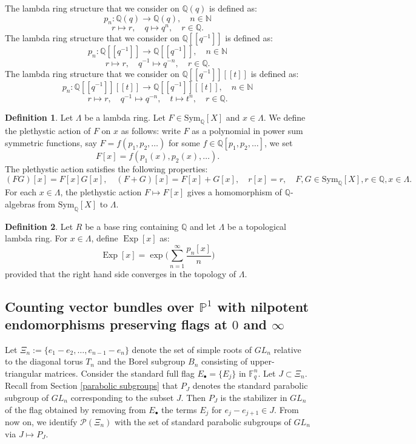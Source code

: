 \documentclass{amsart}
\theoremstyle{plain}
\theoremstyle{definition}
\newtheorem{definition}{Definition}
\theoremstyle{remark}
\DeclareMathOperator{\Exp}{Exp}
\begin{document}
The lambda ring structure that we consider on $\mathbb{Q}(q)$ is defined as:
\[
p_{n}:\mathbb{Q}(q)\rightarrow\mathbb{Q}(q), \quad n\in\mathbb{N}
\]
\[
r\mapsto r, \quad q\mapsto q^{n},\quad r\in\mathbb{Q}.
\]
The lambda ring structure that we consider on $\mathbb{Q}[[q^{-1}]]$ is defined as:
\[
p_{n}:\mathbb{Q}[[q^{-1}]]\rightarrow\mathbb{Q}[[q^{-1}]], \quad n\in\mathbb{N}
\]
\[
r\mapsto r, \quad q^{-1}\mapsto q^{-n},\quad r\in\mathbb{Q}.
\]
The lambda ring structure that we consider on $\mathbb{Q}[[q^{-1}]][[t]]$ is defined as:
\[
p_{n}:\mathbb{Q}[[q^{-1}]][[t]]\rightarrow\mathbb{Q}[[q^{-1}]][[t]] , \quad n\in\mathbb{N}
\]
\[
r\mapsto r, \quad q^{-1}\mapsto q^{-n},\quad t\mapsto t^n,\quad r\in\mathbb{Q}.
\]
\begin{definition}
Let $\Lambda$ be a lambda ring.
Let $F\in\text{Sym}_{\mathbb{Q}}[X]$ and $x\in\Lambda$. We define the plethystic action of $F$ on $x$ as follows: write $F$ as a polynomial in power sum symmetric functions, say $F=f(p_{1},p_{2},\ldots)$ for some $f\in \mathbb{Q}[p_{1},p_{2},\ldots]$, we set
\[
F[x]=f(p_{1}(x),p_{2}(x),\ldots).
\]
The plethystic action satisfies the following properties:
\[
     (FG)[x]=F[x]G[x],\quad (F+G)[x]=F[x]+G[x],\quad r[x]=r, \quad F,G\in\text{Sym}_{\mathbb{Q}}[X], r\in \mathbb{Q}, x\in\Lambda.
\]
For each $x\in\Lambda$, the plethystic action $F\mapsto F[x]$
gives a homomorphism of $\mathbb{Q}$-algebras from $\text{Sym}_{\mathbb{Q}}[X]$ to $\Lambda$.
\end{definition}
\begin{definition}
Let $R$ be a base ring containing $\mathbb{Q}$ and let $\Lambda$ be a topological lambda ring. For $x\in\Lambda$, define $\Exp[x]$ as:
\[
\Exp[x]=\exp\bigg(\sum_{n=1}^{\infty}\frac{p_{n}[x]}{n}\bigg)
\]
provided that the right hand side converges in the topology of $\Lambda$.
\end{definition}
\subsection{Counting vector bundles over $\mathbb{P}^1$ with nilpotent endomorphisms preserving flags at $0$ and $\infty$}
Let $\Xi_{n}:=\{e_{1}-e_{2},\ldots,e_{n-1}-e_{n}\}$ denote the set of simple roots of $GL_n$ relative to the diagonal torus $T_n$ and the Borel subgroup $B_n$ consisting of upper-triangular matrices. Consider the standard full flag $E_{\bullet}=\{E_{j}\}$ in $\mathbb{F}_{q}^{n}$. Let $J\subset\Xi_{n}$. Recall from Section \ref{parabolic subgroups} that $P_{J}$ denotes the standard parabolic subgroup of $GL_{n}$ corresponding to the subset $J$. Then $P_{J}$ is the stabilizer in $GL_{n}$ of the flag obtained by removing from $E_{\bullet}$ the terms $E_{j}$ for $e_{j}-e_{j+1}\in J$. From now on, we identify $\mathcal{P}(\Xi_{n})$ with the set of standard parabolic subgroups of $GL_{n}$ via $J\mapsto P_{J}$. 
\end{document}
